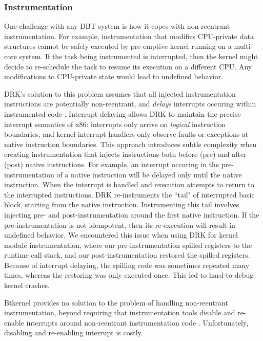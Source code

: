 \documentclass[preprint]{sigplanconf}
\begin{document}
\subsubsection{Instrumentation}

One challenge with any DBT system is how it copes with non-reentrant instrumentation. For example, instrumentation that modifies CPU-private data structures cannot be safely executed by pre-emptive kernel running on a multi-core system. If the task being instrumented is interrupted, then the kernel might decide to re-schedule the task to resume its execution on a different CPU. Any modifications to CPU-private state would lead to undefined behavior.

DRK's solution to this problem assumes that all injected instrumentation instructions are potentially non-reentrant, and \emph{delays} interrupts occuring within instrumented code \cite{DRK}. Interrupt delaying allows DRK to maintain the precise interrupt semantics of x86: interrupts only arrive on \emph{logical} instruction boundaries, and kernel interrupt handlers only observe faults or exceptions at native instruction boundaries. This approach introduces subtle complexity when creating instrumentation that injects instructions both before (pre) and after (post) native instructions. For example, an interrupt occuring in the pre-instrumentation of a native instruction will be delayed only until the native instruction. When the interrupt is handled and execution attempts to return to the interrupted instructions, DRK re-instruments the ``tail" of interrupted basic block, starting from the native instruction. Instrumenting this tail involves injecting pre- and post-instrumentation around the first native instruction. If the pre-instrumentation is not idempotent, then its re-execution will result in undefined behavior. We encountered this issue when using DRK for kernel module instrumentation, where our pre-instrumentation spilled registers to the runtime call stack, and our post-instrumentation restored the spilled registers. Because of interrupt delaying, the spilling code was sometimes repeated many times, whereas the restoring was only executed once. This led to hard-to-debug kernel crashes.

Btkernel provides no solution to the problem of handling non-reentrant instrumentation, beyond requiring that instrumentation tools disable and re-enable interrupts around non-reentrant instrumentation code \cite{btkernel}. Unfortunately, disabling and re-enabling interrupt is costly.
\end{document}
